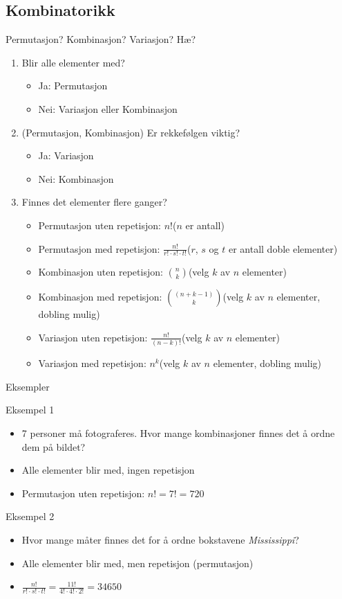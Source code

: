 \subsection*{Kombinatorikk}
\begin{frame}{Permutasjon? Kombinasjon? Variasjon? Hæ?}
\begin{enumerate}[<+->]
\item Blir alle elementer med?
	\begin{itemize}
	\item Ja: Permutasjon
	\item Nei: Variasjon eller Kombinasjon
	\end{itemize}
\item (Permutasjon, Kombinasjon) Er rekkefølgen viktig?
	\begin{itemize}
	\item Ja: Variasjon
	\item Nei: Kombinasjon
	\end{itemize}
\item Finnes det elementer flere ganger?
	\begin{itemize}
	\item Permutasjon uten repetisjon: $n!$\qquad($n$ er antall)
	\item Permutasjon med repetisjon: $\frac{n!}{r!\cdot s!\cdot t!}$\qquad($r$, $s$ og $t$ er antall doble elementer)
	\item Kombinasjon uten repetisjon: $\binom{n}{k}$\qquad(velg $k$ av $n$ elementer)
	\item Kombinasjon med repetisjon: $ \binom{(n+k-1)}{k}$\qquad(velg $k$ av $n$ elementer, dobling mulig)
	\item Variasjon uten repetisjon: $\frac{n!}{(n-k)!}$\qquad(velg $k$ av $n$ elementer)
	\item Variasjon med repetisjon: $n^k$\qquad(velg $k$ av $n$ elementer, dobling mulig)
	\end{itemize}
\end{enumerate}
\end{frame}

\begin{frame}{Eksempler}
\begin{block}{Eksempel 1}
\begin{itemize}
\item 7 personer må fotograferes. Hvor mange kombinasjoner finnes det å ordne dem på bildet?
\item Alle elementer blir med, ingen repetisjon 
\item Permutasjon uten repetisjon: $n!=7!=720$
\end{itemize}
\end{block}
\pause
\begin{block}{Eksempel 2}
\begin{itemize}
\item Hvor mange måter finnes det for å ordne bokstavene \textit{Mississippi}?
\item Alle elementer blir med, men repetisjon (permutasjon)
\item $\frac{n!}{r!\cdot s!\cdot t!} =  \frac{11!}{4!\cdot 4!\cdot 2!}=34650$
\end{itemize}
\end{block}
\end{frame}

